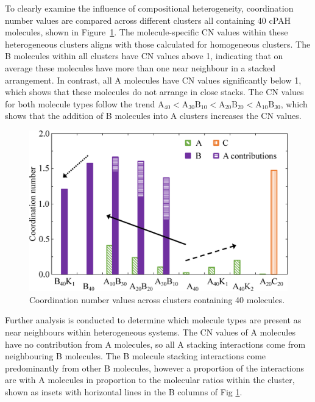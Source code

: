 To clearly examine the influence of compositional heterogeneity, coordination number values are compared across different clusters all containing 40 cPAH molecules, shown in Figure~\ref{fig:coordination_numbers}. The molecule-specific CN values within these heterogeneous clusters aligns with those calculated for homogeneous clusters. The B molecules within all clusters have CN values above 1, indicating that on average these molecules have more than one near neighbour in a stacked arrangement. In contrast, all A molecules have CN values significantly below 1, which shows that these molecules do not arrange in close stacks.  
The CN values for both molecule types follow the trend $\text{A}_{\text{40}} < \text{A}_{\text{30}}\text{B}_{\text{10}} < \text{A}_{\text{20}}\text{B}_{\text{20}} < \text{A}_{\text{10}}\text{B}_{\text{30}}$, which shows that the addition of B molecules into A clusters increases the CN values.
%
\begin{figure}[!bth]
\centering
\includegraphics[width=0.8\linewidth]{Figures/CN_bar_chart_updated.eps}
\caption{Coordination number values across clusters containing 40 molecules.}
\label{fig:coordination_numbers}
\end{figure}
%

Further analysis is conducted to determine which molecule types are present as near neighbours within heterogeneous systems. The CN values of A molecules have no contribution from A molecules, so all A stacking interactions come from neighbouring B molecules. The B molecule stacking interactions come predominantly from other B molecules, however a proportion of the interactions are with A molecules in proportion to the molecular ratios within the cluster, shown as insets with horizontal lines in the B columns of Fig \ref{fig:coordination_numbers}.
%

